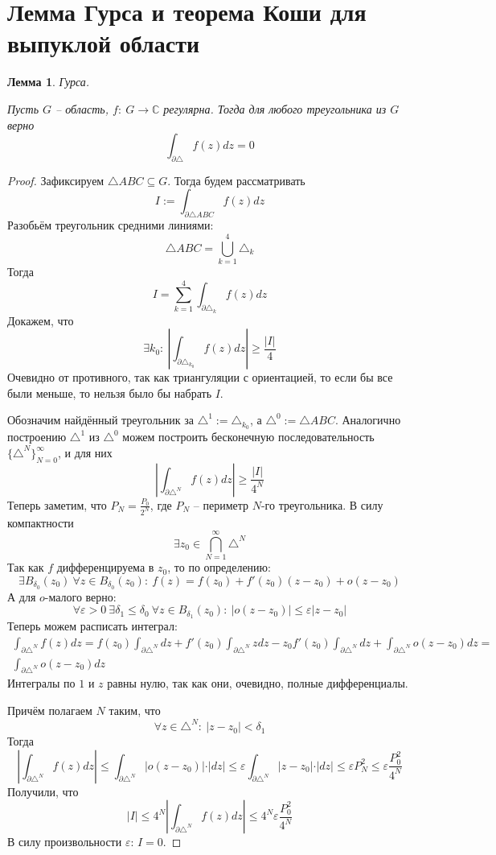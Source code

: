 \documentclass[a4paper,12pt]{article}
\renewcommand{\leq}{\ensuremath{\leqslant}}
\renewcommand{\geq}{\ensuremath{\geqslant}}
\theoremstyle{plain}
\newtheorem{lemma}{Лемма}[section]
\theoremstyle{definition}
\theoremstyle{remark}
\begin{document}
\section{Лемма Гурса и теорема Коши для выпуклой области}
\begin{lemma}
	Гурса.

	Пусть $G$ -- область, $f :\: G \to \mathbb{C}$ регулярна. Тогда для любого треугольника из $G$ верно
	\[
		\int_{\partial\triangle} f(z)dz = 0
	\]
\end{lemma}

\begin{proof}
	Зафиксируем $\triangle ABC \subseteq G$. Тогда будем рассматривать
	\[
		I := \int_{\partial\triangle ABC}f(z)dz
	\]
	Разобьём треугольник средними линиями:
	\[
		\triangle ABC = \bigcup_{k = 1}^4 \triangle_k
	\]
	Тогда
	\[
		I = \sum_{k = 1}^4 \int_{\partial \triangle_k}f(z)dz
	\]
	Докажем, что
	\[
		\exists k_0 :\: \left\vert \int_{\partial \triangle_{k_0}}f(z)dz\right\vert \geq \frac{\vert I\vert}{4}
	\]
	Очевидно от противного, так как триангуляции с ориентацией, то если бы все были меньше, то нельзя было бы набрать $I$.

	Обозначим найдённый треугольник за $\triangle^1 := \triangle_{k_0}$, а $\triangle^0 := \triangle ABC$. Аналогично построению $\triangle^1$ из $\triangle^0$ можем построить бесконечную последовательность $\{\triangle^N\}_{N = 0}^\infty$, и для них
	\[
		\left\vert \int_{\partial \triangle^N}f(z)dz\right\vert \geq \frac{\vert I\vert}{4^N}
	\]
	Теперь заметим, что $P_N = \frac{P_0}{2^N}$, где $P_N$ -- периметр $N$-го треугольника. В силу компактности
	\[
		\exists z_0 \in \bigcap_{N = 1}^\infty \triangle^N
	\]
	Так как $f$ дифференцируема в $z_0$, то по определению:
	\[
		\exists B_{\delta_0}(z_0) \: \forall z \in B_{\delta_0}(z_0) :\: f(z) = f(z_0) + f'(z_0)(z - z_0) + o(z - z_0)
	\]
	А для $o$-малого верно:
	\[
		\forall \varepsilon > 0 \: \exists \delta_1 \leq \delta_0 \: \forall z \in B_{\delta_1}(z_0) :\: \vert o(z - z_0)\vert \leq \varepsilon\vert z - z_0\vert
	\]
	Теперь можем расписать интеграл:
	\begin{align*}
		\int_{\partial\triangle^N}f(z)dz = f(z_0)\int_{\partial\triangle^N}dz + f'(z_0)\int_{\partial\triangle^N}zdz - z_0f'(z_0)\int_{\partial\triangle^N} dz + \int_{\partial\triangle^N}o(z - z_0)dz = \\
		\int_{\partial\triangle^N}o(z - z_0)dz
	\end{align*}
	Интегралы по $1$ и $z$ равны нулю, так как они, очевидно, полные дифференциалы.

	Причём полагаем $N$ таким, что
	\[
		\forall z \in \triangle^N :\: \vert z - z_0\vert < \delta_1
	\]
	Тогда
	\[
		\left\vert\int_{\partial\triangle^N} f(z)dz\right\vert \leq \int_{\partial\triangle^N} \vert o(z - z_0)\vert\cdot\vert dz\vert \leq \varepsilon\int_{\partial\triangle^N} \vert z - z_0\vert\cdot\vert dz\vert \leq \varepsilon P_N^2 \leq \varepsilon\frac{P_0^2}{4^N}
	\]
	Получили, что
	\[
		\vert I\vert \leq 4^N\left\vert\int_{\partial\triangle^N} f(z)dz\right\vert \leq 4^N\varepsilon\frac{P_0^2}{4^N}
	\]
	В силу произвольности $\varepsilon$: $I = 0$.
\end{proof}
\end{document}
